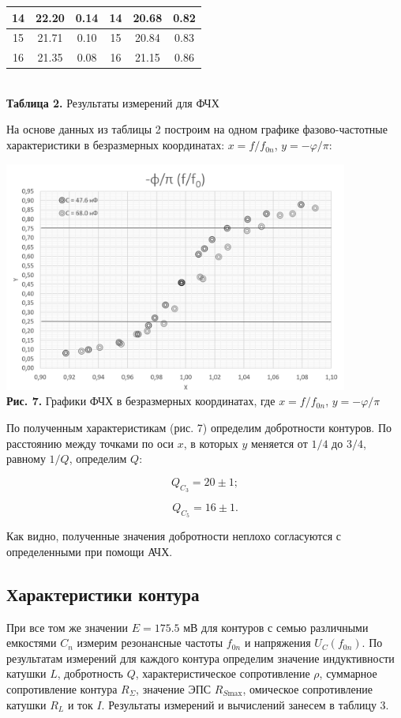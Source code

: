 \documentclass[a4paper,12pt]{article} %
\begin{document}
\begin{center}
\begin{tabular}{ccc||c|c|c|}
		\multicolumn{1}{|c|}{14} & \multicolumn{1}{c|}{22.20} & 0.14 & 14 & 20.68 & 0.82 \\ \hline
		\multicolumn{1}{|c|}{15} & \multicolumn{1}{c|}{21.71} & 0.10 & 15 & 20.84 & 0.83 \\ \hline
		\multicolumn{1}{|c|}{16} & \multicolumn{1}{c|}{21.35} & 0.08 & 16 & 21.15 & 0.86 \\ \hline
	\end{tabular}\\
\hfill \break \textbf {Таблица 2.} Результаты измерений для ФЧХ \\
\end{center}

\hfill \break На основе данных из таблицы 2 построим на одном графике фазово-частотные характеристики в безразмерных координатах: $x = f/f_{0n}$, $y = -\varphi/\pi$:

\begin{center}
\includegraphics[width=0.85\textwidth]{3.2.2_7.png}\\
\textbf{Рис. 7.} Графики ФЧХ в безразмерных координатах, где $x = f/f_{0n}$, $y = -\varphi/\pi$\\
\end{center}

\hfill \break По полученным характеристикам (рис. 7) определим добротности контуров. По расстоянию между точками по оси $x$, в которых $y$ меняется от $1/4$ до $3/4$, равному $1/Q$, определим $Q$:

$$
Q_{C_{3}} = 20 \pm 1;
$$

$$
Q_{C_{5}} = 16 \pm 1.
$$

\hfill \break Как видно, полученные значения добротности неплохо согласуются с определенными при помощи АЧХ.

\subsection{Характеристики контура}
\hfill \break При все том же значении $E = 175.5$ мВ для контуров с семью различными емкостями $C_{n}$ измерим резонансные частоты $f_{0n}$ и напряжения $U_{C}(f_{0n})$. По результатам измерений для каждого контура определим значение индуктивности катушки $L$, добротность $Q$, характеристическое сопротивление $\rho$, суммарное сопротивление контура $R_{\Sigma}$, значение ЭПС $R_{S\text{max}}$, омическое сопротивление катушки $R_{L}$ и ток $I$. Результаты измерений и вычислений занесем в таблицу 3.
\end{document}
